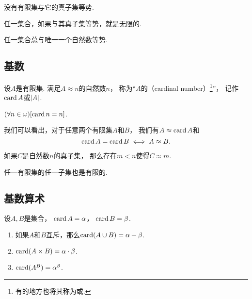 \begin{corollary}
没有有限集与它的真子集等势.
\end{corollary}

\begin{corollary}
任一集合，如果与其真子集等势，就是无限的.
\end{corollary}

\begin{corollary}
任一集合总与唯一一个自然数等势.
\end{corollary}

\subsection{基数}
\begin{definition}
设\(A\)是有限集.
满足\(A \approx n\)的自然数\(n\)，
称为“\(A\)的（cardinal number）\footnote{%
有的地方也将其称为或.
}”，
记作\(\operatorname{card} A\)或\(\abs{A}\).
\end{definition}

\begin{example}
\((\forall n\in\omega)[\operatorname{card} n = n]\).
\end{example}

我们可以看出，对于任意两个有限集\(A\)和\(B\)，
我们有\(A \approx \operatorname{card} A\)和\[
	\operatorname{card} A = \operatorname{card} B
	\iff
	A \approx B.
\]


\begin{lemma}
如果\(C\)是自然数\(n\)的真子集，
那么存在\(m<n\)使得\(C \approx m\).
\end{lemma}

\begin{theorem}
任一有限集的任一子集也是有限的.
\end{theorem}

\subsection{基数算术}
\begin{definition}
设\(A,B\)是集合，
\(\operatorname{card} A = \alpha\)，
\(\operatorname{card} B = \beta\).
\begin{enumerate}
	\item 如果\(A\)和\(B\)互斥，那么\(\operatorname{card}(A \cup B)=\alpha+\beta\).
	\item \(\operatorname{card}(A \times B)=\alpha\cdot\beta\).
	\item \(\operatorname{card}(A^B)=\alpha^\beta\).
\end{enumerate}
\end{definition}
